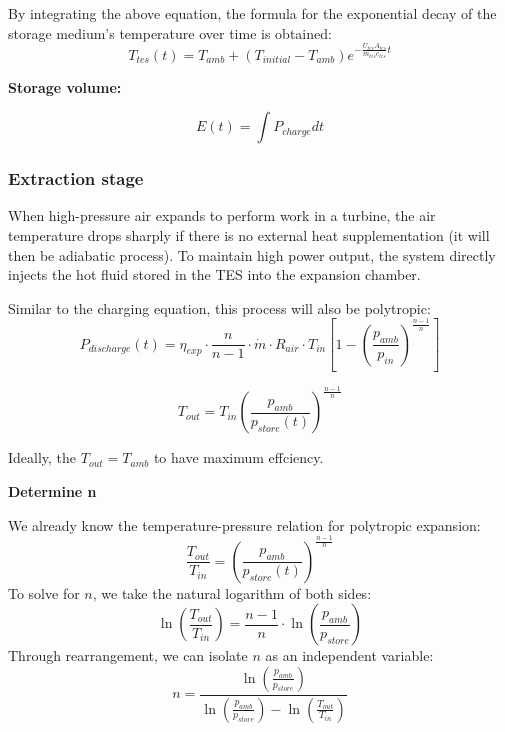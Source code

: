 By integrating the above equation, the formula for the exponential decay of the storage medium's temperature over time is obtained:
\begin{equation}
T_{tes}(t)=T_{amb}+(T_{initial}-T_{amb})e^{-\frac{U_{tes}A_{tes}}{m_{tes}c_{tes}}t}
\end{equation}

\textbf{Storage volume: }

\begin{equation}
    E(t)=\int P_{charge} dt
\end{equation}

\subsubsection{Extraction stage}
When high-pressure air expands to perform work in a turbine, the air temperature drops sharply if there is no external heat supplementation (it will then be adiabatic process). To maintain high power output, the system directly injects the hot fluid stored in the TES into the expansion chamber.

Similar to the charging equation, this process will also be polytropic:
\begin{equation}
    P_{discharge}(t) = \eta_{exp} \cdot \frac{n}{n-1} \cdot \dot{m} \cdot R_{air} \cdot T_{in} \left[ 1 - \left( \frac{p_{amb}}{p_{in}} \right)^{\frac{n-1}{n}} \right]
\end{equation}

$$T_{out} = T_{in} \left( \frac{p_{amb}}{p_{store}(t)} \right)^{\frac{n-1}{n}}$$

Ideally, the $T_{out}=T_{amb}$ to have maximum effciency.

\vspace{1em}
\textbf{Determine n}

We already know the temperature-pressure relation for polytropic expansion:
\begin{equation}
\frac{T_{out}}{T_{in}} = \left( \frac{p_{amb}}{p_{store}(t)} \right)^{\frac{n-1}{n}}
\end{equation}
To solve for $n$, we take the natural logarithm of both sides:
\begin{equation}
\ln\left(\frac{T_{out}}{T_{in}}\right) = \frac{n-1}{n} \cdot \ln\left(\frac{p_{amb}}{p_{store}}\right)
\end{equation}
Through rearrangement, we can isolate $n$ as an independent variable:
\begin{equation}
n = \frac{\ln\left(\frac{p_{amb}}{p_{store}}\right)}{\ln\left(\frac{p_{amb}}{p_{store}}\right) - \ln\left(\frac{T_{out}}{T_{in}}\right)}
\end{equation}

